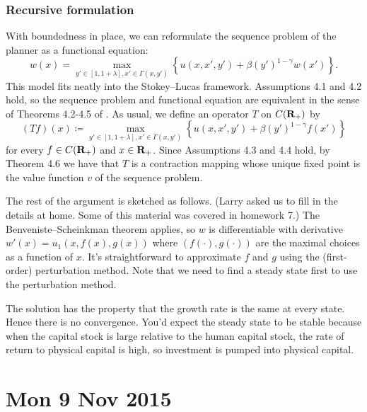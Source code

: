 \documentclass[11pt,letterpaper,reqno,oneside]{article}
\begin{document}
\subsubsection{Recursive formulation}
\label{sec:04Nov2015:human_capital_accumulation_model:recursive}

With boundedness in place, we can reformulate the sequence problem of the planner as a functional equation:
%
\begin{equation*}
	w(x) 
	= 
	\max_{ y' \in [1,1+\lambda] , x' \in \Gamma(x,y') }\left\{
	u(x,x',y')
	+ \beta (y')^{1-\gamma} w(x') 
	\right\} .
\end{equation*}
%
This model fits neatly into the Stokey--Lucas framework. Assumptions 4.1 and 4.2 hold, so the sequence problem and functional equation are equivalent in the sense of Theorems 4.2-4.5 of \textcite{StokeyLucasPrescott1989}. As usual, we define an operator $T$ on $C(\mathbf{R}_+)$ by
%
\begin{equation*}
	(Tf)(x)
	\coloneqq
	\max_{ y' \in [1,1+\lambda] , x' \in \Gamma(x,y') }\left\{
	u(x,x',y')
	+ \beta (y')^{1-\gamma} f(x') 
	\right\} 
\end{equation*}
%
for every $f \in C(\mathbf{R}_+)$ and $x \in \mathbf{R}_+$. Since Assumptions 4.3 and 4.4 hold, by Theorem 4.6 we have that $T$ is a contraction mapping whose unique fixed point is the value function $v$ of the sequence problem.

The rest of the argument is sketched as follows. (Larry asked us to fill in the details at home. Some of this material was covered in homework 7.) The Benveniste--Scheinkman theorem applies, so $w$ is differentiable with derivative $w'(x) = u_1(x,f(x),g(x))$ where $(f(\cdot),g(\cdot))$ are the maximal choices as a function of $x$. It's straightforward to approximate $f$ and $g$ using the (first-order) perturbation method. Note that we need to find a steady state first to use the perturbation method.

The solution has the property that the growth rate is the same at every state. Hence there is no convergence. You'd expect the steady state to be stable because when the capital stock is large relative to the human capital stock, the rate of return to physical capital is high, so investment is pumped into physical capital.



\pagebreak
\section{Mon 9 Nov 2015}
\label{sec:09Nov2015}
\end{document}
